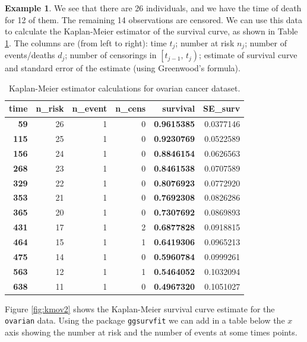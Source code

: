 \documentclass[
  openany]{book}
\theoremstyle{definition}
\theoremstyle{definition}
\newtheorem{example}{Example}[chapter]
\theoremstyle{definition}
\theoremstyle{definition}
\theoremstyle{remark}
\begin{document}
\begin{example}
We see that there are 26 individuals, and we have the time of death for 12 of them. The remaining 14 observations are censored.
We can use this data to calculate the Kaplan-Meier estimator of the survival curve, as shown in Table \ref{tab:ovkm}. The columns are (from left to right): time \(t_j\); number at risk \(n_j\); number of events/deaths \(d_j\); number of censorings in \(\left[t_{j-1},\,t_j\right)\); estimate of survival curve and standard error of the estimate (using Greenwood's formula).

\begin{table}

\caption{\label{tab:ovkm}Kaplan-Meier estimator calculations for ovarian cancer dataset.}
\centering
\begin{tabular}[t]{>{}r|r|r|r|>{}r|r}
\hline
time & n\_risk & n\_event & n\_cens & survival & SE\_surv\\
\hline
\textbf{59} & 26 & 1 & 0 & \textbf{0.9615385} & 0.0377146\\
\hline
\textbf{115} & 25 & 1 & 0 & \textbf{0.9230769} & 0.0522589\\
\hline
\textbf{156} & 24 & 1 & 0 & \textbf{0.8846154} & 0.0626563\\
\hline
\textbf{268} & 23 & 1 & 0 & \textbf{0.8461538} & 0.0707589\\
\hline
\textbf{329} & 22 & 1 & 0 & \textbf{0.8076923} & 0.0772920\\
\hline
\textbf{353} & 21 & 1 & 0 & \textbf{0.7692308} & 0.0826286\\
\hline
\textbf{365} & 20 & 1 & 0 & \textbf{0.7307692} & 0.0869893\\
\hline
\textbf{431} & 17 & 1 & 2 & \textbf{0.6877828} & 0.0918815\\
\hline
\textbf{464} & 15 & 1 & 1 & \textbf{0.6419306} & 0.0965213\\
\hline
\textbf{475} & 14 & 1 & 0 & \textbf{0.5960784} & 0.0999261\\
\hline
\textbf{563} & 12 & 1 & 1 & \textbf{0.5464052} & 0.1032094\\
\hline
\textbf{638} & 11 & 1 & 0 & \textbf{0.4967320} & 0.1051027\\
\hline
\end{tabular}
\end{table}

Figure \ref{fig:kmov2} shows the Kaplan-Meier survival curve estimate for the \texttt{ovarian} data. Using the package \texttt{ggsurvfit} we can add in a table below the \(x\) axis showing the number at risk and the number of events at some times points.


\end{example}
\end{document}
